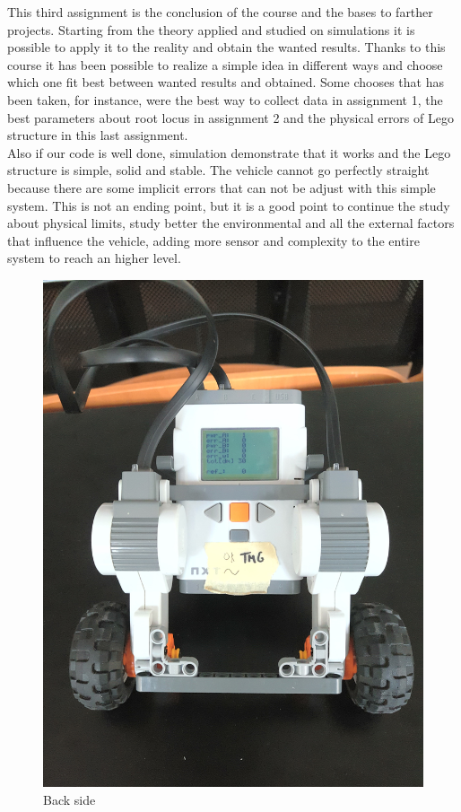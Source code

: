 \documentclass[a4paper,12pt,oneside]{article}
\begin{document}
This third assignment is the conclusion of the course and the bases to farther projects. Starting from the theory applied and studied on simulations it is possible to apply it to the reality and obtain the wanted results. Thanks to this course it has been possible to realize a simple idea in different ways and choose which one fit best between wanted results and obtained. Some chooses that has been taken, for instance, were the best way to collect data in assignment 1, the best parameters about root locus in assignment 2 and the physical errors of Lego structure in this last assignment.\\ Also if our code is well done, simulation demonstrate that it works and the Lego structure is simple, solid and stable. The vehicle cannot go perfectly straight because there are some implicit errors that can not be adjust with this simple system. This is not an ending point, but it is a good point to continue the study about physical limits, study better the environmental and all the external factors that influence the vehicle, adding more sensor and complexity to the entire system to reach an higher level.
\begin{figure}
	\centering
	\includegraphics[width=\columnwidth]{nxtImages/1.jpg}
	\caption{Back side}
	\label{fig:back}
\end{figure}
\end{document}
